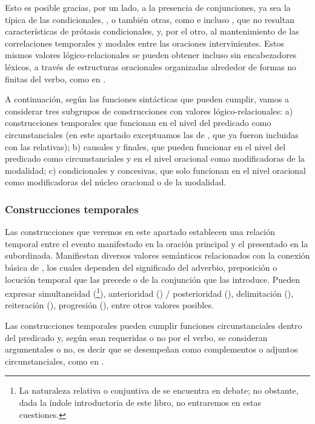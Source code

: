 Esto es posible gracias, por un lado, a la presencia de conjunciones, ya sea la
típica de las condicionales,  , o también
otras, como   e incluso 
, que no resultan características de prótasis
condicionales, y, por el otro, al mantenimiento de las correlaciones temporales y
modales entre las oraciones intervinientes. Estos mismos valores
lógico-relacionales se pueden obtener incluso sin encabezadores léxicos, a través
de estructuras oracionales organizadas alrededor de formas no finitas del verbo,
como en .

A continuación, según las funciones sintácticas que pueden cumplir, vamos a
considerar tres subgrupos de construcciones con valores lógico-relacionales: a)
construcciones temporales que funcionan en el nivel del predicado como
circunstanciales (en este apartado exceptuamos las de , que ya
fueron incluidas con las relativas); b) causales y finales, que pueden funcionar
en el nivel del predicado como circunstanciales y en el nivel oracional como
modificadoras de la modalidad; c) condicionales y concesivas, que solo funcionan
en el nivel oracional como modificadoras del núcleo oracional o de la modalidad.

\subsubsection{Construcciones temporales}\label{sec:13-temporales}

Las construcciones que veremos en este apartado establecen una relación temporal
entre el evento manifestado en la oración principal y el presentado en la
subordinada. Manifiestan diversos valores semánticos relacionados con la conexión
básica de  \parencite{rudolph1996}, los cuales dependen del
significado del adverbio, preposición o locución temporal que las precede o de la
conjunción que las introduce. Pueden expresar simultaneidad
(\footnote{La naturaleza relativa o conjuntiva de
 se encuentra en debate; no obstante, dada la índole
introductoria de este libro, no entraremos en estas cuestiones.}), anterioridad
() / posterioridad (),
delimitación (), reiteración (), progresión (), entre otros valores posibles.

Las construcciones temporales pueden cumplir funciones circunstanciales dentro
del predicado y, según sean requeridas o no por el verbo, se consideran
argumentales o no, es decir que se desempeñan como complementos o adjuntos
circunstanciales, como en .

